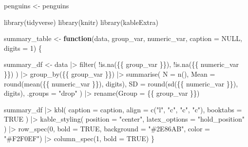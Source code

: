 \documentclass[
  letterpaper,
  DIV=11,
  numbers=noendperiod]{scrartcl}
\newenvironment{Shaded}{\begin{snugshade}}{\end{snugshade}}
\newcommand{\AttributeTok}[1]{\textcolor[rgb]{0.40,0.45,0.13}{#1}}
\newcommand{\ConstantTok}[1]{\textcolor[rgb]{0.56,0.35,0.01}{#1}}
\newcommand{\ControlFlowTok}[1]{\textcolor[rgb]{0.00,0.23,0.31}{\textbf{#1}}}
\newcommand{\DecValTok}[1]{\textcolor[rgb]{0.68,0.00,0.00}{#1}}
\newcommand{\FunctionTok}[1]{\textcolor[rgb]{0.28,0.35,0.67}{#1}}
\newcommand{\NormalTok}[1]{\textcolor[rgb]{0.00,0.23,0.31}{#1}}
\newcommand{\OtherTok}[1]{\textcolor[rgb]{0.00,0.23,0.31}{#1}}
\newcommand{\SpecialCharTok}[1]{\textcolor[rgb]{0.37,0.37,0.37}{#1}}
\newcommand{\StringTok}[1]{\textcolor[rgb]{0.13,0.47,0.30}{#1}}
\begin{document}
\begin{Shaded}
\begin{Highlighting}[]
\NormalTok{penguins }\OtherTok{\textless{}{-}}\NormalTok{ penguins}

\FunctionTok{library}\NormalTok{(tidyverse)}
\FunctionTok{library}\NormalTok{(knitr)}
\FunctionTok{library}\NormalTok{(kableExtra)}

\NormalTok{summary\_table }\OtherTok{\textless{}{-}} \ControlFlowTok{function}\NormalTok{(data, group\_var, numeric\_var,}
                                  \AttributeTok{caption =} \ConstantTok{NULL}\NormalTok{, }\AttributeTok{digits =} \DecValTok{1}\NormalTok{) \{}

\NormalTok{  summary\_df }\OtherTok{\textless{}{-}}\NormalTok{ data }\SpecialCharTok{|\textgreater{}}
    \FunctionTok{filter}\NormalTok{(}
      \SpecialCharTok{!}\FunctionTok{is.na}\NormalTok{(\{\{ group\_var \}\}),}
      \SpecialCharTok{!}\FunctionTok{is.na}\NormalTok{(\{\{ numeric\_var \}\})}
\NormalTok{    ) }\SpecialCharTok{|\textgreater{}}
    \FunctionTok{group\_by}\NormalTok{(\{\{ group\_var \}\}) }\SpecialCharTok{|\textgreater{}}
    \FunctionTok{summarise}\NormalTok{(}
      \AttributeTok{N =} \FunctionTok{n}\NormalTok{(),}
      \AttributeTok{Mean =} \FunctionTok{round}\NormalTok{(}\FunctionTok{mean}\NormalTok{(\{\{ numeric\_var \}\}), digits),}
      \AttributeTok{SD =} \FunctionTok{round}\NormalTok{(}\FunctionTok{sd}\NormalTok{(\{\{ numeric\_var \}\}), digits),}
      \AttributeTok{.groups =} \StringTok{"drop"}
\NormalTok{    ) }\SpecialCharTok{|\textgreater{}}
    \FunctionTok{rename}\NormalTok{(}\AttributeTok{Group =}\NormalTok{ \{\{ group\_var \}\})}

\NormalTok{  summary\_df }\SpecialCharTok{|\textgreater{}}
    \FunctionTok{kbl}\NormalTok{(}
      \AttributeTok{caption =}\NormalTok{ caption,}
      \AttributeTok{align =} \FunctionTok{c}\NormalTok{(}\StringTok{"l"}\NormalTok{, }\StringTok{"c"}\NormalTok{, }\StringTok{"c"}\NormalTok{, }\StringTok{"c"}\NormalTok{),}
      \AttributeTok{booktabs =} \ConstantTok{TRUE}
\NormalTok{    ) }\SpecialCharTok{|\textgreater{}}
    \FunctionTok{kable\_styling}\NormalTok{(}
      \AttributeTok{position =} \StringTok{"center"}\NormalTok{,}
      \AttributeTok{latex\_options =} \StringTok{"hold\_position"}
\NormalTok{    ) }\SpecialCharTok{|\textgreater{}}
    \FunctionTok{row\_spec}\NormalTok{(}\DecValTok{0}\NormalTok{, }\AttributeTok{bold =} \ConstantTok{TRUE}\NormalTok{, }\AttributeTok{background =} \StringTok{"\#2E86AB"}\NormalTok{, }\AttributeTok{color =} \StringTok{"\#F2F0EF"}\NormalTok{) }\SpecialCharTok{|\textgreater{}}
    \FunctionTok{column\_spec}\NormalTok{(}\DecValTok{1}\NormalTok{, }\AttributeTok{bold =} \ConstantTok{TRUE}\NormalTok{)}
\NormalTok{\}}
\end{Highlighting}
\end{Shaded}
\end{document}
